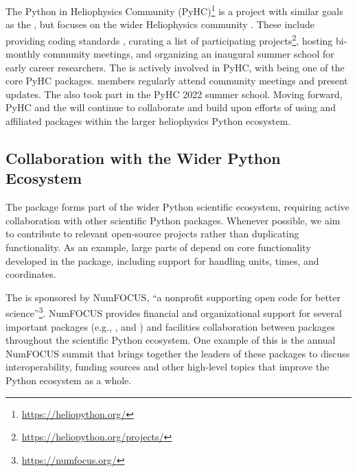 The Python in Heliophysics Community (PyHC)\footnote{\url{https://heliopython.org/}} \citep{barnum2022python} is a project with similar goals as the \sunpyproj, but focuses on the wider Heliophysics community \citep{https://doi.org/10.1029/2018JA025877}.
These include providing coding standards \citep{annex_a_2018_2529131}, curating a list of participating projects\footnote{\url{https://heliopython.org/projects/}}, hosting bi-monthly community meetings, and organizing an inaugural summer school for early career researchers.
The \sunpyproj is actively involved in PyHC, with \sunpypkg being one of the core PyHC packages.
\sunpyproj members regularly attend community meetings and present updates.
The \sunpyproj also took part in the PyHC 2022 summer school.
Moving forward, PyHC and the \sunpyproj will continue to collaborate and build upon efforts of using \sunpypkg and affiliated packages within the larger heliophysics Python ecosystem.

\subsection{Collaboration with the Wider Python Ecosystem}
\label{ssec:collaboration-with-the-wider-python-ecosystem}

The \sunpypkg package forms part of the wider Python scientific ecosystem, requiring active collaboration with other scientific Python packages.
Whenever possible, we aim to contribute to relevant open-source projects rather than duplicating functionality.
As an example, large parts of \sunpypkg depend on core functionality developed in the \astropypkg package, including support for handling units, times, and coordinates.

The \sunpyproj is sponsored by NumFOCUS, \enquote{a nonprofit supporting open code for better science}\footnote{\url{https://numfocus.org/}}.
NumFOCUS provides financial and organizational support for several important packages (e.g., ,  and ) and facilities collaboration between packages throughout the scientific Python ecosystem.
One example of this is the annual NumFOCUS summit that brings together the leaders of these packages to discuss interoperability, funding sources and other high-level topics that improve the Python ecosystem as a whole.

